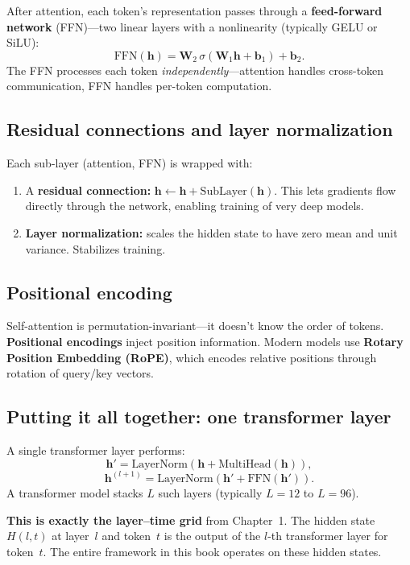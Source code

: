 \documentclass[11pt, twoside, openright]{memoir}
\begin{document}
After attention, each token's representation passes through a
\textbf{feed-forward network} (FFN)---two linear layers with a nonlinearity
(typically GELU or SiLU):
\[
  \text{FFN}(\mathbf{h}) = \mathbf{W}_2 \, \sigma(\mathbf{W}_1 \mathbf{h}
  + \mathbf{b}_1) + \mathbf{b}_2.
\]
The FFN processes each token \emph{independently}---attention handles
cross-token communication, FFN handles per-token computation.

\subsection{Residual connections and layer normalization}

Each sub-layer (attention, FFN) is wrapped with:
\begin{enumerate}[nosep]
\item A \textbf{residual connection:} $\mathbf{h} \leftarrow \mathbf{h}
  + \text{SubLayer}(\mathbf{h})$.  This lets gradients flow directly
  through the network, enabling training of very deep models.
\item \textbf{Layer normalization:} scales the hidden state to have zero
  mean and unit variance.  Stabilizes training.
\end{enumerate}

\subsection{Positional encoding}

Self-attention is permutation-invariant---it doesn't know the order of
tokens.  \textbf{Positional encodings} inject position information.
Modern models use \textbf{Rotary Position Embedding (RoPE)}, which encodes
relative positions through rotation of query/key vectors.

\subsection{Putting it all together: one transformer layer}

A single transformer layer performs:
\[
  \mathbf{h}' = \text{LayerNorm}(\mathbf{h} + \text{MultiHead}(\mathbf{h})),
\]
\[
  \mathbf{h}^{(l+1)} = \text{LayerNorm}(\mathbf{h}' + \text{FFN}(\mathbf{h}')).
\]
A transformer model stacks $L$ such layers (typically $L = 12$ to $L = 96$).

\begin{keyidea}
\textbf{This is exactly the layer--time grid} from Chapter~1.  The hidden
state $H(l,t)$ at layer~$l$ and token~$t$ is the output of the $l$-th
transformer layer for token~$t$.  The entire framework in this book operates
on these hidden states.
\end{keyidea}
\end{document}
